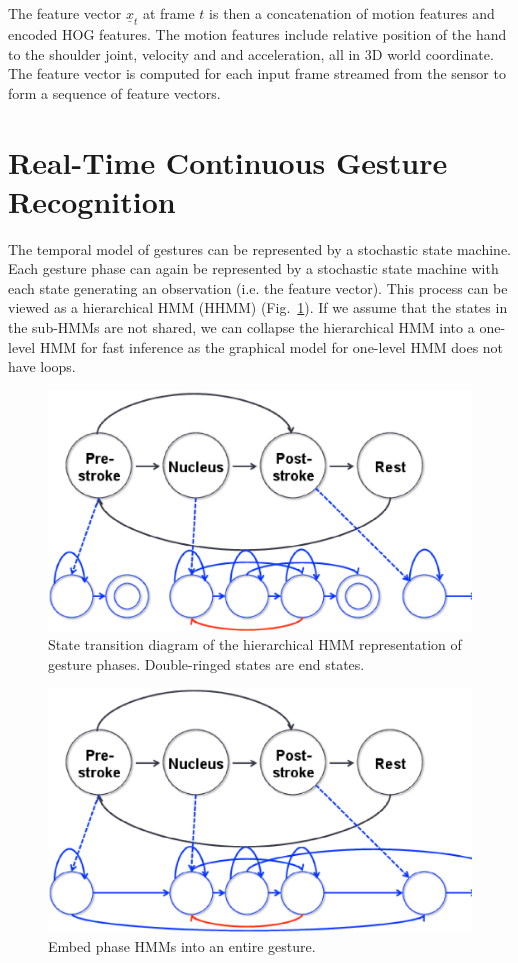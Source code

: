 \documentclass[conference]{IEEEtran}
\begin{document}
The feature vector $\underline{x}_t$ at frame $t$ is then a concatenation of motion features and encoded HOG features. The
motion features include relative position of the hand to the shoulder joint,
velocity and and acceleration, all in 3D world coordinate. The feature vector is
computed for each input frame streamed from the sensor to form a sequence of
feature vectors.

\section{Real-Time Continuous Gesture Recognition}
The temporal model of gestures can be represented by a stochastic state machine.
Each gesture phase can again be represented by a stochastic state machine with
each state generating an observation (i.e. the feature vector). This process
can be viewed as a hierarchical HMM (HHMM) (Fig.~\ref{fig:hhmm}). If we assume
that the states in the sub-HMMs are not shared, we can collapse the hierarchical HMM
into a one-level HMM for fast inference as the graphical model for one-level HMM
does not have loops.

\begin{figure}[!t]
\centering
\includegraphics[width=\columnwidth]{fig/hhmm.ps}
\caption{State transition diagram of the hierarchical HMM representation of
gesture phases. Double-ringed states are end states.}
\label{fig:hhmm}
\end{figure}

\begin{figure}[!t]
\centering
\includegraphics[width=\columnwidth]{fig/embedded.ps}
\caption{Embed phase HMMs into an entire gesture.}
\label{fig:embed}
\end{figure}
\end{document}
